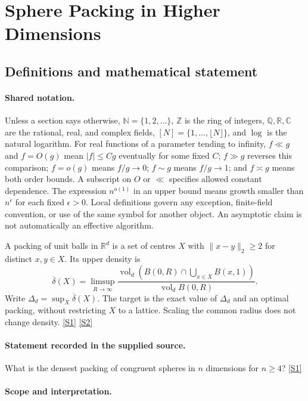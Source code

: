 \documentclass[11pt,a4paper]{article}
\newcommand{\N}{\mathbb{N}}
\newcommand{\Z}{\mathbb{Z}}
\newcommand{\Q}{\mathbb{Q}}
\newcommand{\R}{\mathbb{R}}
\newcommand{\C}{\mathbb{C}}
\newcommand{\sref}[2]{\hyperlink{source:#1:#2}{[S#2]}}
\begin{document}
\section{Sphere Packing in Higher Dimensions}\label{statement}


\subsection{Definitions and mathematical statement}

\paragraph{Shared notation.}Unless a section says otherwise, $\N=\{1,2,\ldots\}$,
$\Z$ is the ring of integers, $\Q,\R,\C$ are the rational, real, and complex
fields, $[N]=\{1,\ldots,\lfloor N\rfloor\}$, and $\log$ is the natural
logarithm. For real functions of a parameter tending to infinity,
$f\ll g$ and $f=O(g)$ mean $|f|\leq Cg$ eventually for some fixed $C$;
$f\gg g$ reverses this comparison; $f=o(g)$ means $f/g\to0$;
$f\sim g$ means $f/g\to1$; and $f\asymp g$ means both order bounds.
A subscript on $O$ or $\ll$ specifies allowed constant dependence.
The expression $n^{o(1)}$ in an upper bound means growth smaller than
$n^\epsilon$ for each fixed $\epsilon>0$. Local definitions govern any
exception, finite-field convention, or use of the same symbol for another
object. An asymptotic claim is not automatically an effective algorithm.



A packing of unit balls in $\R^d$ is a set of centres $X$ with $\|x-y\|_2\geq2$ for distinct $x,y\in X$. Its upper density is
\[\overline\delta(X)=\limsup_{R\to\infty}\frac{\operatorname{vol}_d(B(0,R)\cap\bigcup_{x\in X}B(x,1))}{\operatorname{vol}_d B(0,R)}.\]
Write $\Delta_d=\sup_X\overline\delta(X)$. The target is the exact value of $\Delta_d$ and an optimal packing, without restricting $X$ to a lattice. Scaling the common radius does not change density. \sref{statement}{1} \sref{statement}{2}

\paragraph{Statement recorded in the supplied source.}
What is the densest packing of congruent spheres in $n$ dimensions for $n \geq 4$? \sref{statement}{1}

\paragraph{Scope and interpretation.}
\end{document}
